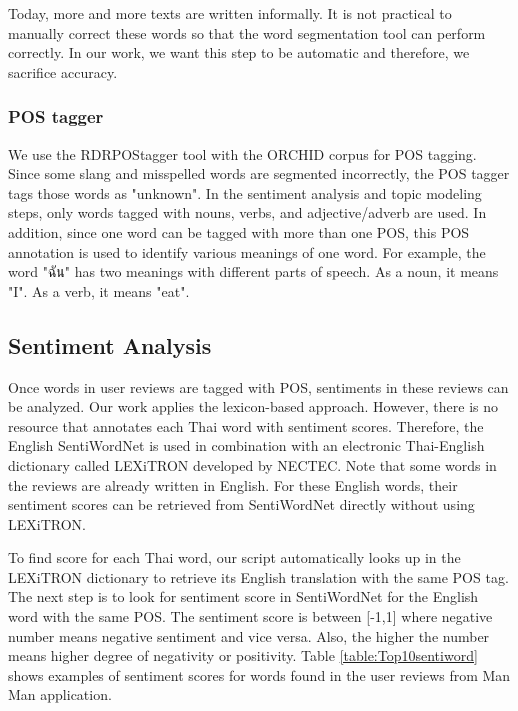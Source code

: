 Today, more and more texts are written informally. It is not practical to manually correct these words so that the word segmentation tool can perform correctly. In our work, we want this step to be automatic and therefore, we sacrifice accuracy. 


\subsubsection{POS tagger}

We use the RDRPOStagger tool\cite{RDRPOSTagger} with the ORCHID corpus\cite{ORCHID} for POS tagging. Since some slang and misspelled words are segmented incorrectly, the POS tagger tags those words as "unknown". In the sentiment analysis and topic modeling steps, only words tagged with nouns, verbs, and adjective/adverb are used. In addition, since one word can be tagged with more than one POS, this POS annotation is used to identify various meanings of one word. For example, the word "{ฉัน}" has two meanings with different parts of speech. As a noun, it means "I". As a verb, it means "eat".

\subsection{Sentiment Analysis}
Once words in user reviews are tagged with POS, sentiments in these reviews can be analyzed. Our work applies the lexicon-based approach. However, there is no resource that annotates each Thai word with sentiment scores. Therefore, the English SentiWordNet \cite{SentiWordNet} is used in combination with an electronic Thai-English dictionary called LEXiTRON \cite{LEXiTRON} developed by NECTEC. Note that some words in the reviews are already written in English. For these English words, their sentiment scores can be retrieved from SentiWordNet directly without using LEXiTRON.

To find score for each Thai word, our script automatically looks up in the LEXiTRON dictionary to retrieve its English translation with the same POS tag. The next step is to look for sentiment score in SentiWordNet for the English word with the same POS. The sentiment score is between [-1,1] where negative number means negative sentiment and vice versa. Also, the higher the number means higher degree of negativity or positivity. Table \ref{table:Top10sentiword} shows examples of sentiment scores for words found in the user reviews from Man Man application. 

